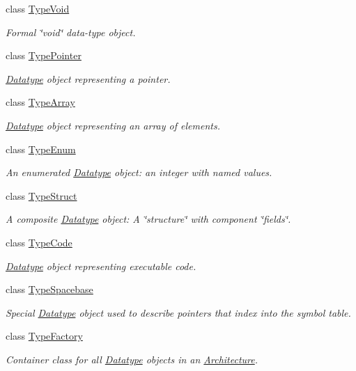 \begin{DoxyCompactItemize}
class \mbox{\hyperlink{class_type_void}{Type\+Void}}
\begin{DoxyCompactList}\small\item\em Formal \char`\"{}void\char`\"{} data-\/type object. \end{DoxyCompactList}\item 
class \mbox{\hyperlink{class_type_pointer}{Type\+Pointer}}
\begin{DoxyCompactList}\small\item\em \mbox{\hyperlink{class_datatype}{Datatype}} object representing a pointer. \end{DoxyCompactList}\item 
class \mbox{\hyperlink{class_type_array}{Type\+Array}}
\begin{DoxyCompactList}\small\item\em \mbox{\hyperlink{class_datatype}{Datatype}} object representing an array of elements. \end{DoxyCompactList}\item 
class \mbox{\hyperlink{class_type_enum}{Type\+Enum}}
\begin{DoxyCompactList}\small\item\em An enumerated \mbox{\hyperlink{class_datatype}{Datatype}} object\+: an integer with named values. \end{DoxyCompactList}\item 
class \mbox{\hyperlink{class_type_struct}{Type\+Struct}}
\begin{DoxyCompactList}\small\item\em A composite \mbox{\hyperlink{class_datatype}{Datatype}} object\+: A \char`\"{}structure\char`\"{} with component \char`\"{}fields\char`\"{}. \end{DoxyCompactList}\item 
class \mbox{\hyperlink{class_type_code}{Type\+Code}}
\begin{DoxyCompactList}\small\item\em \mbox{\hyperlink{class_datatype}{Datatype}} object representing executable code. \end{DoxyCompactList}\item 
class \mbox{\hyperlink{class_type_spacebase}{Type\+Spacebase}}
\begin{DoxyCompactList}\small\item\em Special \mbox{\hyperlink{class_datatype}{Datatype}} object used to describe pointers that index into the symbol table. \end{DoxyCompactList}\item 
class \mbox{\hyperlink{class_type_factory}{Type\+Factory}}
\begin{DoxyCompactList}\small\item\em Container class for all \mbox{\hyperlink{class_datatype}{Datatype}} objects in an \mbox{\hyperlink{class_architecture}{Architecture}}. \end{DoxyCompactList}\end{DoxyCompactItemize}
